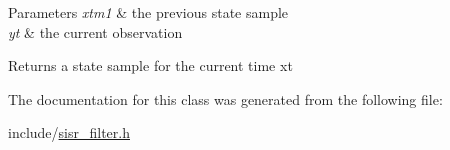 \begin{DoxyParams}{Parameters}
{\em xtm1} & the previous state sample \\
\hline
{\em yt} & the current observation \\
\hline
\end{DoxyParams}
\begin{DoxyReturn}{Returns}
a state sample for the current time xt 
\end{DoxyReturn}


The documentation for this class was generated from the following file\+:\begin{DoxyCompactItemize}
\item 
include/\hyperlink{sisr__filter_8h}{sisr\+\_\+filter.\+h}\end{DoxyCompactItemize}

